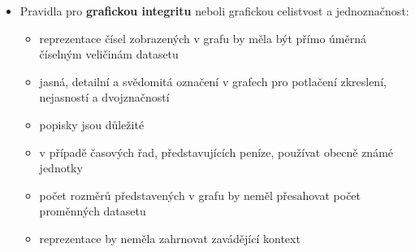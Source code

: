 \documentclass[12pt,]{article}
\providecommand{\tightlist}{%
  \setlength{\itemsep}{0pt}\setlength{\parskip}{0pt}}
\begin{document}
\newpage

\begin{itemize}
\tightlist
\item
  Pravidla pro \textbf{grafickou integritu} neboli grafickou celistvost
  a jednoznačnost:

  \begin{itemize}
  \tightlist
  \item
    reprezentace čísel zobrazených v grafu by měla být přímo úměrná
    číselným veličinám datasetu
  \item
    jasná, detailní a svědomitá označení v grafech pro potlačení
    zkreslení, nejasností a dvojznačností
  \item
    popisky jsou důležité
  \item
    v případě časových řad, představujících peníze, používat obecně
    známé jednotky
  \item
    počet rozměrů představených v grafu by neměl přesahovat počet
    proměnných datasetu
  \item
    reprezentace by neměla zahrnovat zavádějící kontext
  \end{itemize}
\end{itemize}
\end{document}
